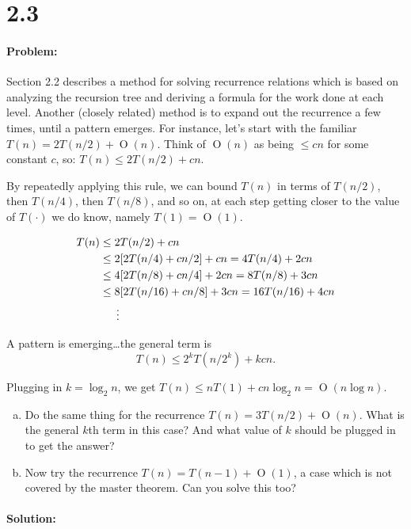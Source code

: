 \documentclass[12pt]{article}
\newcommand{\BigO}[1]{\ensuremath{\operatorname{O}\left(#1\right)}}
\begin{document}
	
\section*{2.3}
\paragraph{Problem:}
Section 2.2 describes a method for solving recurrence relations which is
based on analyzing the recursion tree and deriving a formula for the
work done at each level.  Another (closely related) method is to expand
out the recurrence a few times, until a pattern emerges. For instance,
let’s start with the familiar $T(n) = 2T(n/2) + \BigO{n}$. Think of
$\BigO{n}$ as being $\leq cn$ for some constant $c$,
so: $T(n) \leq 2T(n/2) + cn$. 

By repeatedly applying this rule, we can bound $T(n)$ in terms of $T(n/2)$,
then $T(n/4)$, then $T(n/8)$, and so on, at each step getting closer to
the value of $T(\cdot)$ we do know,
namely $T(1) = \BigO{1}$.

\begin{align*}
T (n) &\leq 2T (n/2) + cn \\
&\leq 2[2T(n/4) + cn/2] + cn = 4T(n/4) + 2cn \\
&\leq 4[2T(n/8) + cn/4] + 2cn = 8T(n/8) + 3cn \\
&\leq 8[2T(n/16) + cn/8] + 3cn = 16T(n/16) + 4cn \\
&\indent \vdots
\end{align*}

A pattern is emerging\ldots the general term is 
\[T(n) \leq 2^kT(n/2^k) + kcn.\]

Plugging in $k = \log_2{n}$, we get $T(n) \leq nT(1) + cn\log_2{n} = \BigO{n\log{n}}.$

\begin{enumerate}[(a)]
\item Do the same thing for the recurrence $T(n) = 3T(n/2) + \BigO{n}$. What
is the general $k$th term
in this case? And what value of $k$ should be plugged in to get the
answer?

\item Now try the recurrence $T(n) = T( n −1 ) + \BigO{1}$, a case which is not
covered by the master theorem. Can you solve this too?
\end{enumerate}

\paragraph{Solution:}
\end{document}
